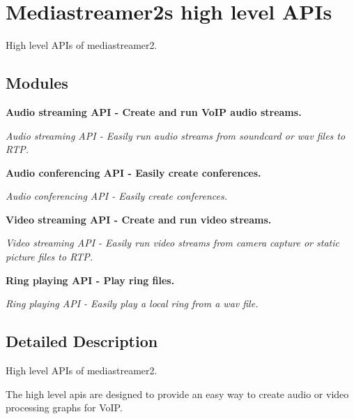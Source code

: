 \section{Mediastreamer2\textquotesingle{}s high level A\+P\+Is}
\label{group__mediastreamer2__high__api}


High level A\+P\+Is of mediastreamer2.  


\subsection*{Modules}
\begin{DoxyCompactItemize}
\item 
\textbf{ Audio streaming A\+P\+I -\/ Create and run Vo\+I\+P audio streams.}
\begin{DoxyCompactList}\small\item\em Audio streaming A\+PI -\/ Easily run audio streams from soundcard or wav files to R\+TP. \end{DoxyCompactList}\item 
\textbf{ Audio conferencing A\+P\+I -\/ Easily create conferences.}
\begin{DoxyCompactList}\small\item\em Audio conferencing A\+PI -\/ Easily create conferences. \end{DoxyCompactList}\item 
\textbf{ Video streaming A\+P\+I -\/ Create and run video streams.}
\begin{DoxyCompactList}\small\item\em Video streaming A\+PI -\/ Easily run video streams from camera capture or static picture files to R\+TP. \end{DoxyCompactList}\item 
\textbf{ Ring playing A\+P\+I -\/ Play ring files.}
\begin{DoxyCompactList}\small\item\em Ring playing A\+PI -\/ Easily play a local ring from a wav file. \end{DoxyCompactList}\end{DoxyCompactItemize}


\subsection{Detailed Description}
High level A\+P\+Is of mediastreamer2. 

The high level apis are designed to provide an easy way to create audio or video processing graphs for Vo\+IP. 